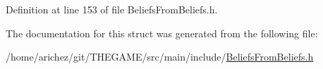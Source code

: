 Definition at line 153 of file Beliefs\-From\-Beliefs.\-h.



The documentation for this struct was generated from the following file\-:\begin{DoxyCompactItemize}
\item 
/home/arichez/git/\-T\-H\-E\-G\-A\-M\-E/src/main/include/\hyperlink{_beliefs_from_beliefs_8h}{Beliefs\-From\-Beliefs.\-h}\end{DoxyCompactItemize}

